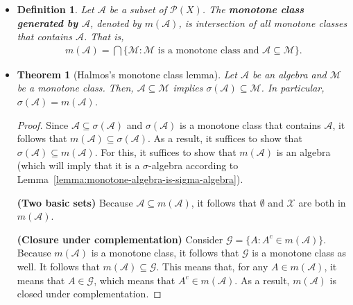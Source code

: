 \documentclass[10pt]{article}
\newtheorem{theorem}[lemma]{Theorem}
\newtheorem{definition}[lemma]{Definition}
\newcommand{\mcal}[1]{\mathcal{#1}}
\newcommand{\X}{\mathcal{X}}
\begin{document}
\begin{itemize}
  \begin{proof}
    We only have to show that $\mcal{A}$ is closed under arbitrary countable unions. Let $(A_n)$ be a sequence of sets in $\mcal{A}$. Define $B_n = \bigcup_{i=1}^n A_i$. We have that $B_n \in \mcal{A}$ for all $n$ because $\mcal{A}$ is an algebra. Moreover, because $B_n \subseteq B_{n+1}$ for all $n$, it follows that $\bigcup_{n=1}^\infty B_n \in \mcal{A}$ because $\mcal{A}$ is a monotone class. Because $\bigcup_{n=1}^\infty A_n = \bigcup_{n=1}^\infty B_n$, we have that $\bigcup_{n=1}^\infty A_n \in \mcal{A}$ too, so $\mcal{A}$ is a $\sigma$-algebra.
  \end{proof}

  \item \begin{definition}
    Let $\mcal{A}$ be a subset of $\mcal{P}(X)$. The {\bf monotone class generated by $\mcal{A}$}, denoted by $m(\mcal{A})$, is intersection of all monotone classes that contains $\mcal{A}$. That is,
    \begin{align*}
      m(\mcal{A}) = \bigcap \{ \mcal{M} : \mcal{M}\mbox{ is a monotone class and }\mcal{A} \subseteq \mcal{M} \}.
    \end{align*}
  \end{definition}

  \item \begin{theorem}[Halmos's monotone class lemma] \label{theorem:monotone-class}
    Let $\mcal{A}$ be an algebra and $\mcal{M}$ be a monotone class. Then, $\mcal{A} \subseteq \mcal{M}$ implies $\sigma(\mcal{A}) \subseteq \mcal{M}$. In particular, $\sigma(\mcal{A}) = m(\mcal{A})$.
  \end{theorem}  
  
  \begin{proof}
    Since $\mcal{A} \subseteq \sigma(\mcal{A})$ and $\sigma(\mcal{A})$ is a monotone class that contains $\mcal{A}$, it follows that $m(\mcal{A}) \subseteq \sigma(\mcal{A})$. As a result, it suffices to show that $\sigma(\mcal{A}) \subseteq m(\mcal{A})$. For this, it suffices to show that $m(\mcal{A})$ is an algebra (which will imply that it is a $\sigma$-algebra according to Lemma~\ref{lemma:monotone-algebra-is-sigma-algebra}).

    {\bf (Two basic sets)} Because $\mcal{A} \subseteq m(\mcal{A})$, it follows that $\emptyset$ and $\X$ are both in $m(\mcal{A})$.

    {\bf (Closure under complementation)} Consider $\mcal{G} = \{ A : A^c \in m(\mcal{A}) \}$. Because $m(\mcal{A})$ is a monotone class, it follows that $\mcal{G}$ is a monotone class as well. It follows that $m(\mcal{A}) \subseteq \mcal{G}$. This means that, for any $A \in m(\mcal{A})$, it means that $A \in \mcal{G}$, which means that $A^c \in m(\mcal{A})$. As a result, $m(\mcal{A})$ is closed under complementation.


\end{proof}
\end{itemize}
\end{document}
